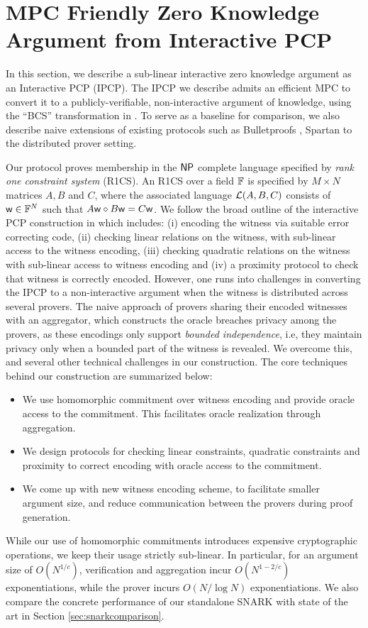 \section{MPC Friendly Zero Knowledge Argument from Interactive PCP}
In this section, we describe a sub-linear interactive zero knowledge argument as
an Interactive PCP (IPCP). The IPCP we describe admits an efficient MPC to
convert it to a publicly-verifiable, non-interactive argument of knowledge,
using the ``BCS'' transformation in \cite{BCS16}. To serve as a
baseline for comparison, we also describe naive extensions of existing protocols
such as Bulletproofs \cite{bulletproofs}, Spartan \cite{spartan} to the
distributed prover setting. 

Our protocol proves membership in the $\mathsf{NP}$ complete
language specified by {\em rank one constraint system} (R1CS). An R1CS over a
field $\mathbb{F}$ is specified by $M\times N$ matrices $A,B$ and $C$, where the
associated language $\mathcal{L}(A,B,C)$ consists of $\mathsf{w}\in \mathbb{F}^N$ such that
$A\mathsf{w}\circ B\mathsf{w}=C\mathsf{w}$. We follow the broad outline of the interactive PCP
construction in \cite{ligero} which includes: (i) encoding the witness via suitable
error correcting code, (ii) checking linear relations on the witness, with
sub-linear access to the witness encoding, (iii) checking quadratic relations on
the witness with sub-linear access to witness encoding and (iv) a proximity
protocol to check that witness is correctly encoded. However, one runs into 
challenges in converting the IPCP to a non-interactive
argument when the witness is distributed across several provers. The naive
approach of provers sharing their encoded witnesses with an aggregator, which
constructs the oracle breaches privacy among the provers, as these encodings
only support {\em bounded independence}, i.e, they maintain privacy only when a
bounded part of the witness is revealed. We overcome this, and several other
technical challenges in our construction. The core techniques behind our
construction are summarized below:
\begin{itemize}
\item We use homomorphic commitment over witness encoding and provide oracle
access to the commitment. This facilitates oracle realization through
aggregation.
\item We design protocols for checking linear constraints, quadratic constraints
and proximity to correct encoding with oracle access to the commitment.
\item We come up with new witness encoding scheme, to facilitate smaller
argument size, and reduce communication between the provers during proof
generation.
\end{itemize}
While our use of homomorphic commitments introduces expensive cryptographic
operations, we keep their usage strictly sub-linear. In particular, for an
argument size of $O(N^{1/c})$, verification and aggregation incur $O(N^{1-2/c})$
exponentiations, while the prover incurs $O(N/\log N)$ exponentiations. We also
compare the concrete performance of our standalone SNARK with state of the art in Section
\ref{sec:snarkcomparison}.
